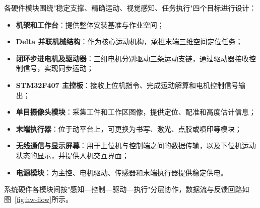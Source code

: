 ﻿\documentclass[UTF8,zihao=-4,fontset=windows]{ctexart}
\begin{document}
各硬件模块围绕"稳定支撑、精确运动、视觉感知、任务执行"四个目标进行设计：
\begin{itemize}
  \item \textbf{机架和工作台}：提供整体安装基准与作业空间；
  \item \textbf{Delta 并联机械结构}：作为核心运动机构，承担末端三维空间定位任务；
  \item \textbf{闭环步进电机及驱动器}：三组电机分别驱动三条运动支链，通过驱动器接收控制信号，实现同步运动；
  \item \textbf{STM32F407 主控板}：接收上位机指令、完成运动解算和电机控制信号输出；
  \item \textbf{单目摄像头模块}：采集工件和工作区图像，提供定位、配准和高度估计信息；
  \item \textbf{末端执行器}：位于动平台上，可更换为书写、激光、点胶或喷印等模块；
  \item \textbf{无线通信与显示屏幕}：用于上位机与控制端之间的数据传输，以及下位机运动状态的显示，并提供人机交互界面；
  \item \textbf{电源模块}：为主控、电机驱动、传感器和末端执行器提供稳定供电。
\end{itemize}

系统硬件各模块间按"感知—控制—驱动—执行"分层协作，数据流与反馈回路如图~\ref{fig:hw-flow}所示。
\end{document}
